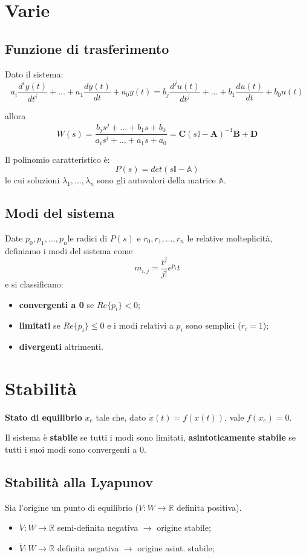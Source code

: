 \documentclass[a4paper]{article}
\renewcommand{\vec}{\bm}
\begin{document}
	\section*{Varie}
	\subsection*{Funzione di trasferimento}
	Dato il sistema: \[ a_i \frac{d^iy(t)}{dt^i} + \dots + a_1 \frac{dy(t)}{dt} + a_0y(t) = b_j\frac{d^ju(t)}{dt^j} + \dots + b_1\frac{du(t)}{dt} + b_0 u(t) \]

	allora \[ W(s) = \frac{b_js^j + \dots + b_1s + b_0}{a_is^i + \dots + a_1s + a_0} = \vec{C}(s\mathbb{I} - \vec{A})^{-1}\vec{B} + \vec{D} \]

	Il polinomio caratteristico è: \[P(s) = det(s\mathbb{I} - \mathbb{A})\] le cui soluzioni $\lambda_1, \dots, \lambda_n $ sono gli autovalori della matrice $\mathbb{A}$.


	\subsection*{Modi del sistema}
	Date $p_0, p_1, \dots, p_n$le radici di $P(s)$ e $r_0, r_1, \dots, r_n$ le relative molteplicità, definiamo i modi del sistema come \[m_{i, j} = \frac{t^j}{j!}e^{p_i}t\] e si classificano: \begin{itemize}
		\item \textbf{convergenti a 0} se $Re\lbrace p_i\rbrace < 0$;
		\item \textbf{limitati} se $Re\lbrace p_i\rbrace \leq 0$ e i modi relativi a $p_i$ sono semplici ($r_i = 1$);
		\item \textbf{divergenti} altrimenti.
	\end{itemize}
	\noindent\hrulefill
	\section*{Stabilità}
	\textbf{Stato di equilibrio} $x_e$ tale che, dato $\dot{x}(t) = f(x(t))$, vale $f(x_e) = 0$.

	\noindent
	Il sistema è \textbf{stabile} se tutti i modi sono limitati, \textbf{asintoticamente stabile} se tutti i suoi modi sono convergenti a 0.

	\subsection*{Stabilità alla Lyapunov}
	Sia l'origine un punto di equilibrio ($V: W \to \mathbb{R}$ definita positiva).
	\begin{itemize}
		\item $\dot{V}: W \to \mathbb{R}$ semi-definita negativa $\rightarrow$ origine stabile;
		\item $\dot{V}: W \to \mathbb{R}$ definita negativa $\rightarrow$ origine asint. stabile;
	\end{itemize}
\end{document}
